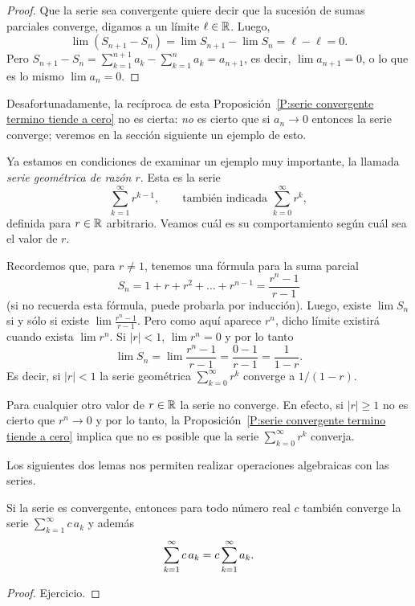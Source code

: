 \begin{proof}
    Que la serie \seriean sea convergente quiere decir que la sucesión \sucSn de sumas parciales converge, digamos a un límite $\ell\in\mathbb{R}$. Luego,
    \[
    \lim (S_{n+1}-S_n) = \lim S_{n+1} - \lim S_n = \ell - \ell = 0.
    \]
    Pero $S_{n+1} - S_n = \sum_{k=1}^{n+1} a_k - \sum_{k=1}^n a_k = a_{n+1}$, es decir, $\lim a_{n+1} = 0$, o lo que es lo mismo $\lim a_n = 0$.
\end{proof}

Desafortunadamente, la recíproca de esta Proposición~\ref{P:serie convergente termino tiende a cero} no es cierta: \emph{no} es cierto que si $a_n \to 0$ entonces la serie \seriean converge; veremos en la sección siguiente un ejemplo de esto.

Ya estamos en condiciones de examinar un ejemplo muy importante, la llamada \emph{serie geométrica de razón $r$}. Esta es la serie
\[
\sum_{k=1}^\infty r^{k-1}, \qquad \text{también indicada }
\sum_{k=0}^\infty r^k,
\]
definida para $r\in\mathbb{R}$ arbitrario. Veamos cuál es su comportamiento según cuál sea el valor de $r$.

Recordemos que, para $r\neq 1$, tenemos una fórmula para la suma parcial 
\[ 
S_n = 1+r+r^2 + \dots + r^{n-1} = \frac{r^n-1}{r-1}
\]
(si no recuerda esta fórmula, puede probarla por inducción).
Luego, existe $\lim S_n$ si y sólo si existe $\lim \frac{r^n-1}{r-1}$.
Pero como aquí aparece $r^n$, dicho límite existirá cuando exista $\lim r^n$.
Si $|r|<1$, $\lim r^n = 0$ y por lo tanto
\[
\lim S_n = \lim \frac{r^n-1}{r-1} = \frac{0-1}{r-1} = \frac{1}{1-r}.
\]
Es decir, si $|r|<1$ la serie geométrica $\sum_{k=0}^\infty r^k$ converge a $1/(1-r)$.

Para cualquier otro valor de $r\in\mathbb{R}$ la serie no converge. En efecto, si $|r|\ge 1$ no es cierto que $r^n \to 0$ y por lo tanto, la Proposición~\ref{P:serie convergente termino tiende a cero} implica que no es posible que la serie $\sum_{k=0}^\infty r^k$ converja.

Los siguientes dos lemas nos permiten realizar operaciones algebraicas con las series.

\begin{lemma}
Si la serie \serieak es convergente, entonces para todo número real $c$ también converge la serie $\sum_{k=1}^\infty c\, a_k$ y además
\[
\sum_{k=1}^\infty c\, a_k = c \sum_{k=1}^\infty a_k.
\]
\end{lemma}

\begin{proof}
    Ejercicio.
\end{proof}

